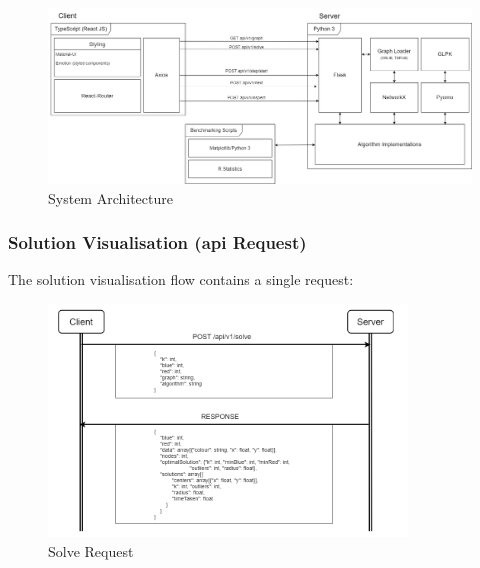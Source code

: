 \begin{figure}[H]
    \centering
    \includegraphics[width=\textwidth]{images/system_architecture.png}
    \caption{System Architecture}
    \label{fig:system_architecture}
\end{figure}

\subsubsection{Solution Visualisation (\texorpdfstring{\acrshort{api}}{API} Request)}
The solution visualisation flow contains a single request:
\begin{figure}[H]
    \centering
    \includegraphics[width=0.85\textwidth]{images/solver_ui/post_solve_flow.png}
    \caption{Solve Request}
    \label{fig:solve_request}
\end{figure}

